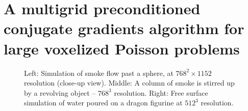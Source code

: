 \chapter{A multigrid preconditioned conjugate gradients algorithm for large voxelized Poisson problems}
\begin{figure}[ht]
 \caption{Left: Simulation of smoke flow past a sphere, at $768^2\!\times\!1152$ resolution (close-up view). Middle: A column of smoke is stirred up by a revolving object -- $768^3$ resolution. Right: Free
   surface simulation of water poured on a dragon figurine at $512^3$ resolution.}
\end{figure}


